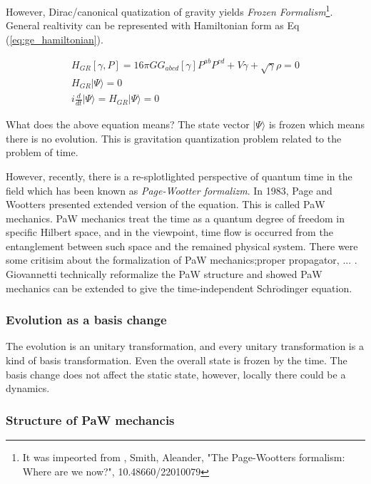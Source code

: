 However, Dirac/canonical quatization of gravity yields \textit{Frozen Formalism}\footnote{It was impeorted from , Smith, Aleander, "The Page-Wootters formalism: Where are we now?", 10.48660/22010079}. 
General realtivity can be represented with Hamiltonian form as Eq (\ref{eq:ge_hamiltonian}).

\begin{align}
    H_{GR}[\gamma , P] = 16 \pi G  G_{abcd}[\gamma] P^{ab} P^{cd} + V{\gamma} + \sqrt{\gamma} \rho =0 \label{eq:ge_hamiltonian}\\
    H_{GR} | \Psi \rangle = 0\\
    i \frac{d}{d t} | \Psi \rangle = H_{GR} | \Psi \rangle = 0
\end{align}

What does the above equation means? The state vector $| \Psi \rangle$ is frozen which means there is no evolution.
This is gravitation quantization problem related to the problem of time.

However, recently, there is a re-splotlighted perspective of quantum time in the field which has been known as 
\textit{Page-Wootter formalizm}. In 1983, Page and Wootters presented extended version of the equation\cite{PhysRevD.27.2885}. 
This is called PaW mechanics.
PaW mechanics treat the time as a quantum degree of freedom in specific Hilbert space, and 
in the viewpoint, time flow is occurred from the entanglement between such space and the remained physical system.
There were some critisim about the formalization of PaW mechanics;proper propagator, ... .
Giovannetti technically reformalize the PaW structure and showed PaW mechanics can be extended 
to give the time-independent Schr$\ddot{\mbox{o}}$dinger  equation\cite{PhysRevD.92.045033}.


\subsubsection{Evolution as a basis change}

The evolution is an unitary transformation, and 
every unitary transformation is a kind of basis transformation.
Even the overall state is frozen by the time. 
The basis change does not affect the static state,
however, locally there could be a dynamics.

\subsubsection{Structure of PaW mechancis}

